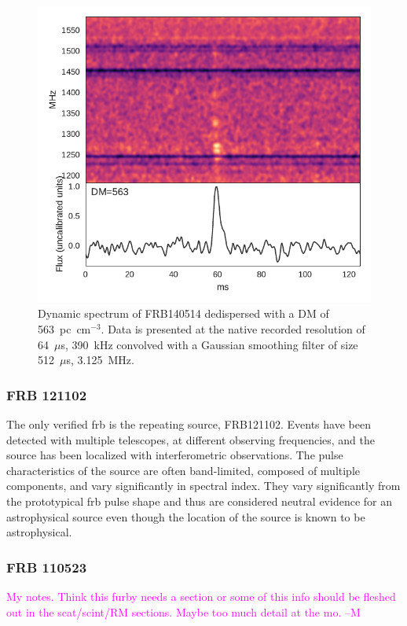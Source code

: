 \documentclass[a4paper,fleqn,usenatbib]{mnras}
\newcommand{\cM}[1]{\textcolor{magenta}{ #1 --M}}
\begin{document}

\begin{figure}
    \includegraphics[width=1.0\linewidth]{figures/FRB140514.pdf}
    \caption{Dynamic spectrum of FRB140514 dedispersed with a DM of
    563~pc~cm$^{-3}$.  Data is presented at the native recorded resolution of
    64~$\mu$s, 390~kHz convolved with a Gaussian smoothing filter of size
    512~$\mu$s, 3.125~MHz.
    }
    \label{fig:FRB140514}
\end{figure}

\subsubsection{FRB 121102}

The only verified \gls{frb} is the repeating source, FRB121102. Events have been
detected with multiple telescopes, at different observing frequencies, and the
source has been localized with interferometric observations. The pulse
characteristics of the source are often band-limited, composed of multiple
components, and vary significantly in spectral index. They vary significantly
from the prototypical \gls{frb} pulse shape and thus are considered neutral
evidence for an astrophysical source even though the location of the source is
known to be astrophysical. 

\subsubsection{FRB 110523}
\cM{My notes. Think this furby needs a section or some of this info should be fleshed out in the scat/scint/RM sections. Maybe too much detail at the mo.}
\end{document}
